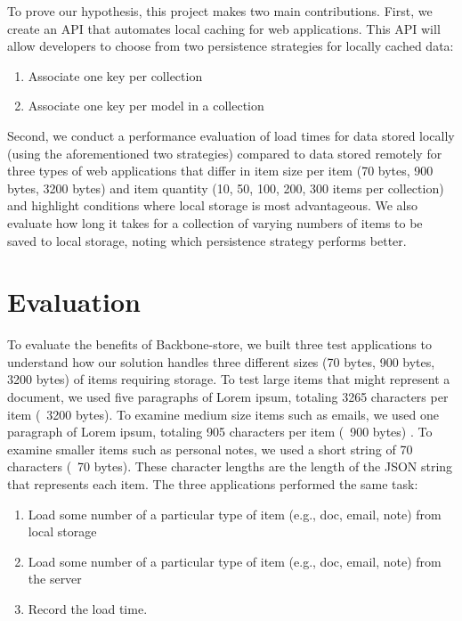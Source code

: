 \documentclass[12pt]{article}
\begin{document}
To prove our hypothesis, this project makes two main contributions. First, we create an API that
automates local caching for web applications. This API will allow developers to
choose from two persistence strategies for locally cached data:

\begin{enumerate}
\item Associate one key per collection
\item Associate one key per model in a collection
\end{enumerate}

Second, we conduct a performance evaluation of load times for data
stored locally (using the aforementioned two strategies) compared to data
stored remotely for three types of web applications that differ in item size
per item (70 bytes, 900 bytes, 3200 bytes) and item quantity (10, 50, 100, 200,
300 items per collection) and highlight conditions where local storage is most
advantageous. We also evaluate how long it takes for a collection of varying numbers of items to be saved to local storage, noting which persistence strategy performs better.

\section{Evaluation}

To evaluate the benefits of Backbone-store, we built three test applications to
understand how our solution handles three different sizes (70 bytes, 900 bytes, 3200 bytes) of items requiring
storage. To test large items that might represent a document, we used five
paragraphs of Lorem ipsum, totaling 3265 characters per item (~3200 bytes). To examine
medium size items such as emails, we used one paragraph of Lorem ipsum,
totaling 905 characters per item (~900 bytes) . To examine smaller items such as personal
notes, we used a short string of 70 characters (~70 bytes). These character lengths are the
length of the JSON string that represents each item. The three applications
performed the same task: 
\begin{enumerate}
\item Load some number of a particular type of item (e.g., doc, email, note) from
local storage
\item Load some number of a particular type of item (e.g., doc, email, note) from the server
\item Record the load time.
\end{enumerate}
\end{document}
